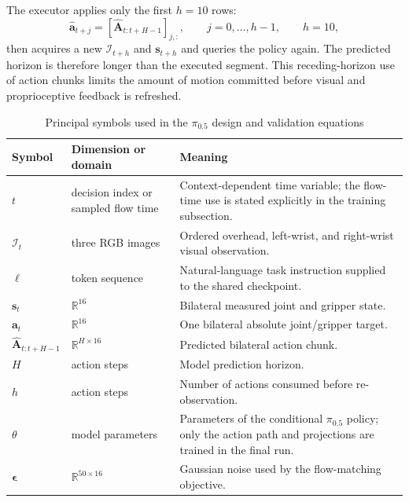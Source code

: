 The executor applies only the first \(h=10\) rows:
\begin{equation}
  \widehat{\mathbf a}_{t+j}
  =
  \left[
  \widehat{\mathbf A}_{t:t+H-1}
  \right]_{j,:},
  \qquad j=0,\ldots,h-1,
  \qquad h=10,
  \label{eq:ch4-receding-horizon}
\end{equation}
then acquires a new \(\mathcal I_{t+h}\) and \(\mathbf s_{t+h}\) and queries the
policy again. The predicted horizon is therefore longer than the executed
segment. This receding-horizon use of action chunks limits the amount of motion
committed before visual and proprioceptive feedback is refreshed.

\begin{table}[htbp]
  \centering
  \caption{Principal symbols used in the $\pi_{0.5}$ design and validation equations}
  \label{tab:ch4-symbols}
  \small
  \begin{tabularx}{\textwidth}{
    >{\centering\arraybackslash}p{}
    >{\raggedright\arraybackslash}p{}
    X}
    \toprule
    \textbf{Symbol} & \textbf{Dimension or domain} & \textbf{Meaning} \\
    \midrule
    \(t\) & decision index or sampled flow time & Context-dependent time variable; the flow-time use is stated explicitly in the training subsection. \\
    \(\mathcal I_t\) & three RGB images & Ordered overhead, left-wrist, and right-wrist visual observation. \\
    \(\ell\) & token sequence & Natural-language task instruction supplied to the shared checkpoint. \\
    \(\mathbf s_t\) & \(\mathbb R^{16}\) & Bilateral measured joint and gripper state. \\
    \(\mathbf a_t\) & \(\mathbb R^{16}\) & One bilateral absolute joint/gripper target. \\
    \(\widehat{\mathbf A}_{t:t+H-1}\) & \(\mathbb R^{H\times16}\) & Predicted bilateral action chunk. \\
    \(H\) & 50 action steps & Model prediction horizon. \\
    \(h\) & 10 action steps & Number of actions consumed before re-observation. \\
    \(\theta\) & model parameters & Parameters of the conditional $\pi_{0.5}$ policy; only the action path and projections are trained in the final run. \\
    \(\boldsymbol\epsilon\) & \(\mathbb R^{50\times16}\) & Gaussian noise used by the flow-matching objective. \\

\end{tabularx}
\end{table}
